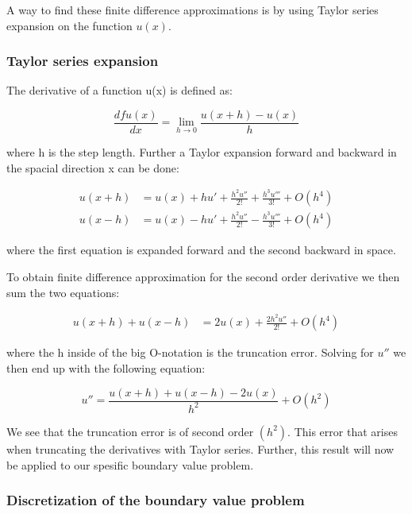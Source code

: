 \documentclass{article}
\begin{document}
\medskip

A way to find these finite difference approximations is by using Taylor series expansion on the function $u(x)$. 

\subsubsection{Taylor series expansion}

The derivative of a function u(x) is defined as:

\begin{equation}
\frac{dfu(x)}{dx} = \lim_{h \to 0} \frac{u(x+h) - u(x)}{h}
\end{equation}

where h is the step length. Further a Taylor expansion forward and backward in the spacial direction x can be done: 

\begin{align*}
u(x+h)& = u(x) + hu' + \frac{h^2u''}{2!}  + \frac{h^3u'''}{3!} + O(h^4)\\
u(x-h)& = u(x) - hu' +  \frac{h^2u''}{2!} -\frac{h^3u'''}{3!} + O(h^4)
\end{align*}

where the first equation is expanded forward and the second backward in space.  

\medskip

To obtain finite difference approximation for the second order derivative we then sum the two equations:

\begin{align*}
u(x+h) + u(x-h)& = 2u(x) + \frac{2h^2u''}{2!} + O(h^4) 
\end{align*}

where the h inside of the big O-notation is the truncation error.
Solving for $u''$ we then end up with the following equation:

\begin{equation}
u'' = \frac{u(x+h) + u(x-h) -2u(x)}{h^2} + O(h^2)
\end{equation}

We see that the truncation error is of second order $(h^2)$.  This error that arises when truncating the derivatives with Taylor series. Further, this result will now be applied to our spesific boundary value problem. 

\subsubsection{Discretization of the boundary value problem}
\end{document}
